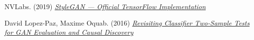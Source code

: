\documentclass[12pt]{article}
\begin{document}
\begin{thebibliography}{9}
        NVLabs. (2019) \href{https://github.com/NVlabs/stylegan}{\textit{StyleGAN — Official TensorFlow Implementation}}

        David Lopez-Paz, Maxime Oquab. (2016)
        \href{https://research.fb.com/wp-content/uploads/2017/04/neural_tests.pdf?}{\textit{Revisiting Classifier Two-Sample Tests for GAN Evaluation and Causal Discovery}}

    \end{thebibliography}
\end{document}
